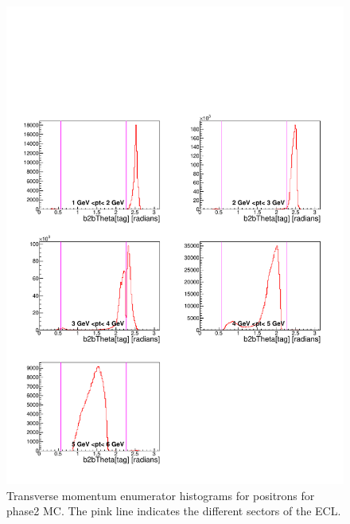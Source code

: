 \documentclass[a4paper,11pt,twosided,final,german,openbib,pdftex,listof=totoc,bibliography=totoc]{scrbook}
\begin{document}
\begin{appendix}
\begin{figure}[!htbp]
	\centering
	\includegraphics[width=\textwidth]{Plots/master/xPtMThetaepE_MC}
	\caption[Transverse Momentum $\theta$ Positron Enumerator Histogram Phase2 MC]{Transverse momentum enumerator histograms for positrons for phase2 MC. The pink line indicates the different sectors of the ECL.}
	\label{plt:PtMThetaepE_MC}
\end{figure}


\end{appendix}
\end{document}
